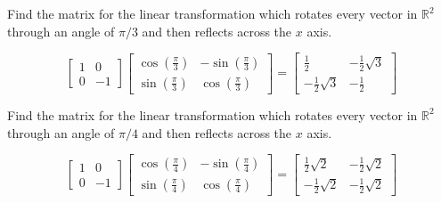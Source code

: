 \documentclass{ximera}
\begin{document}
\begin{problem}\label{prb:6.17} Find the matrix for the linear transformation which rotates every
vector in $\mathbb{R}^{2}$ through an angle of $\pi /3$ and then reflects
across the $x$ axis.
\begin{hint}
\[
\left[
\begin{array}{rr}
1 & 0 \\
0 & -1
\end{array}
\right] \left[
\begin{array}{cc}
\cos \left( \frac{\pi }{3}\right)  & -\sin \left( \frac{\pi }{3}\right)  \\
\sin \left( \frac{\pi }{3}\right)  & \cos \left( \frac{\pi }{3}\right)
\end{array}
\right] = \left[
\begin{array}{cc}
\frac{1}{2} & -\frac{1}{2}\sqrt{3} \\
-\frac{1}{2}\sqrt{3} & -\frac{1}{2}
\end{array}
\right]
\]
\end{hint}
\end{problem}

\begin{problem}\label{prb:6.18} Find the matrix for the linear transformation which rotates every
vector in $\mathbb{R}^{2}$ through an angle of $\pi /4$ and then reflects
across the $x$ axis.
\begin{hint}
\[
\left[
\begin{array}{rr}
1 & 0 \\
0 & -1
\end{array}
\right] \left[
\begin{array}{cc}
\cos \left( \frac{\pi }{4}\right)  & -\sin \left( \frac{\pi }{4}\right)  \\
\sin \left( \frac{\pi }{4}\right)  & \cos \left( \frac{\pi }{4}\right)
\end{array}
\right]  =  \left[
\begin{array}{cc}
\frac{1}{2}\sqrt{2} & -\frac{1}{2}\sqrt{2} \\
-\frac{1}{2}\sqrt{2} & -\frac{1}{2}\sqrt{2}
\end{array}
\right]
\]
\end{hint}
\end{problem}
\end{document}
